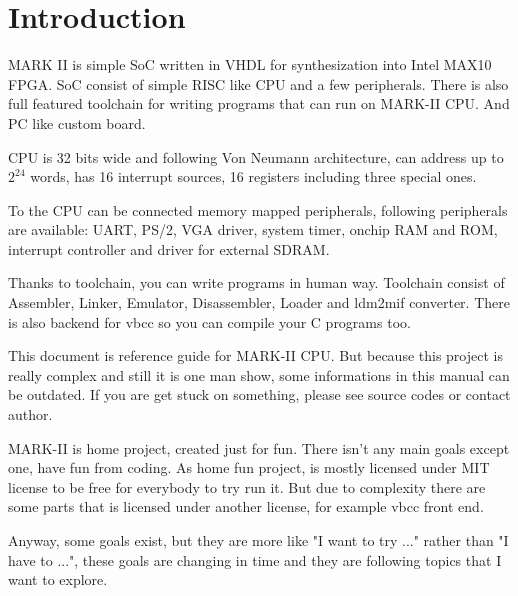 \section{Introduction}

MARK II is simple SoC written in VHDL for synthesization into Intel 
MAX10 FPGA. SoC consist of simple RISC like CPU and a few peripherals. 
There is also full featured toolchain for writing programs that can run 
on MARK-II CPU. And PC like custom board.

CPU is 32 bits wide and following Von Neumann architecture, can address up to
$2^{24}$ words, has 16 interrupt sources, 16 registers including three special
ones.

To the CPU can be connected memory mapped peripherals, following 
peripherals are available: UART, PS/2, VGA driver, system timer, onchip 
RAM and ROM, interrupt controller and driver for external SDRAM.

Thanks to toolchain, you can write programs in human way. Toolchain consist of
Assembler, Linker, Emulator, Disassembler, Loader and ldm2mif converter. There is
also backend for vbcc so you can compile your C programs too.

This document is reference guide for MARK-II CPU. But because this project is really
complex and still it is one man show, some informations in this manual can be
outdated. If you are get stuck on something, please see source codes or
contact author.

MARK-II is home project, created just for fun. There isn't any main goals
except one, have fun from coding. As home fun project, is mostly licensed under
MIT license to be free for everybody to try run it. But due to complexity there
are some parts that is licensed under another license, for example vbcc front
end.

Anyway, some goals exist, but they are more like "I want to try ..." rather than
"I have to ...", these goals are changing in time and they are following topics
that I want to explore.
